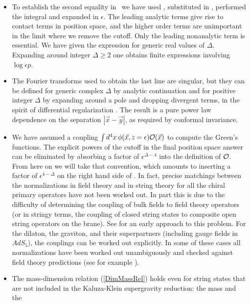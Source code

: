   \begin{itemize}
   \item
 To establish the second equality in \TwoPtFct\ we have used 
\BoundaryProp , substituted in  \Squad,  performed
the integral  and expanded in
$\epsilon$.  The leading analytic terms give rise to contact terms in
position space, and the higher order terms are unimportant in the
limit where we remove the cutoff.  Only the leading nonanalytic term
is essential.  We have given the expression for generic real values of
$\Delta$.  Expanding around integer $\Delta \geq 2$ one obtains finite
expressions involving $\log \epsilon p$.
   \item{}
 The Fourier transforms used to obtain the last line are singular, but they
can be defined for generic complex $\Delta$ by analytic continuation and
for positive integer $\Delta$ by expanding around a pole and dropping
divergent terms, in the spirit of differential regularization
\cite{Freedman:1992tk}.  The result is a pure power law dependence on the
separation $|\vec{x}-\vec{y}|$, as required by conformal invariance.
   \item{}
 We have assumed a coupling $\int d^4x \, \phi(\vec{x},z=\epsilon) {\cal
O}(\vec{x})$ 
to compute the Green's functions.  The explicit powers of the cutoff in
the final position space answer can be eliminated by absorbing a factor of
$\epsilon^{\Delta-4}$ into the definition of ${\cal O}$.  From here on we
will take that convention, which amounts to inserting a factor of
$\epsilon^{4-\Delta}$ on the right hand side of \BoundaryProp.  
In fact, precise matchings between the normalizations in field theory
and in string theory
for all the chiral primary operators have not
been worked out.  In part this is due to the difficulty of determining the
coupling of bulk fields to field theory operators (or in stringy terms, the
coupling of closed string states to composite open string operators on the
brane).  See \cite{Gubser:1997yh} for an early approach to this problem.
For the dilaton, the graviton, and their superpartners (including gauge
fields in $AdS_5$), the couplings can be worked out explicitly.  In some of
these cases all normalizations have been worked out unambiguously and
checked against field theory predictions (see for example
\cite{Gubser:1998bc,Freedman:1998tz,D'Hoker:1999tz}).
   \item{}
 The mass-dimension relation (\ref{DimMassRel})
 holds even for string states that are not
included in the Kaluza-Klein supergravity reduction: the mass and the

\end{itemize}
